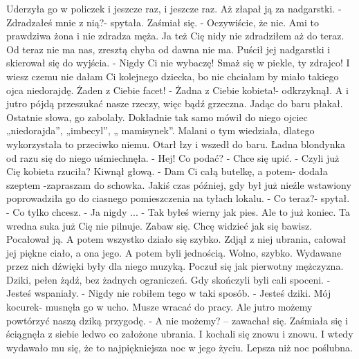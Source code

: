 \documentclass[12pt,a4paper]{book}
\begin{document}
Uderzyła go w policzek i jeszcze raz, i jeszcze raz. Aż złapał ją za nadgarstki. 
- Zdradzałeś mnie z nią?- spytała.
Zaśmiał się.
- Oczywiście, że nie. Ami to prawdziwa żona i nie zdradza męża. Ja też Cię nidy nie zdradziłem aż do teraz. Od teraz nie ma nas, zresztą chyba od dawna nie ma. 
Puścił jej nadgarstki i skierował się do wyjścia.
- Nigdy Ci nie wybaczę! Smaż się w piekle, ty zdrajco! I wiesz czemu nie dałam Ci kolejnego dziecka, bo nie chciałam by miało takiego ojca niedorajdę. Żaden z Ciebie facet! 
- Żadna z Ciebie kobieta!- odkrzyknął. A i jutro pójdą przeszukać nasze rzeczy, więc bądź grzeczna. 
Jadąc do baru płakał. Ostatnie słowa, go zabolały. Dokładnie tak samo mówił do niego ojciec „niedorajda”, „imbecyl”, „ mamisynek”. Malani o tym wiedziała, dlatego wykorzystała to przeciwko niemu. Otarł łzy i wszedł do baru. Ładna blondynka od razu się do niego uśmiechnęła. 
- Hej! Co podać?
- Chce się upić.
- Czyli już Cię kobieta rzuciła?
Kiwnął głową.
- Dam Ci całą butelkę, a potem- dodała szeptem -zapraszam do schowka.
Jakiś czas później, gdy był już nieźle wstawiony poprowadziła go do ciasnego pomieszczenia na tyłach lokalu.
- Co teraz?- spytał. 
- Co tylko chcesz.
- Ja nigdy ...
- Tak byłeś wierny jak pies. Ale to już koniec. Ta wredna suka już Cię nie pilnuje. Zabaw się. Chcę widzieć jak się bawisz. 
Pocałował ją. A potem wszystko działo się szybko. Zdjął z niej ubrania, całował jej piękne ciało, a ona jego. A potem byli jednością. Wolno, szybko. Wydawane przez nich dźwięki były dla niego muzyką. Poczuł się jak pierwotny mężczyzna. Dziki, pełen żądź, bez żadnych ograniczeń. 
Gdy skończyli byli cali spoceni. 
- Jesteś wspaniały.
- Nigdy nie robiłem tego w taki sposób.
- Jesteś dziki. Mój kocurek- musnęła go w ucho. Musze wracać do pracy. Ale jutro możemy powtórzyć naszą dziką przygodę. 
- A nie możemy? – zawachał się.
Zaśmiała się i ściągnęła z siebie ledwo co założone ubrania. I kochali się znowu i znowu. I wtedy wydawało mu się, że to najpiękniejsza noc w jego życiu. Lepsza niż noc poślubna. 
\end{document}
